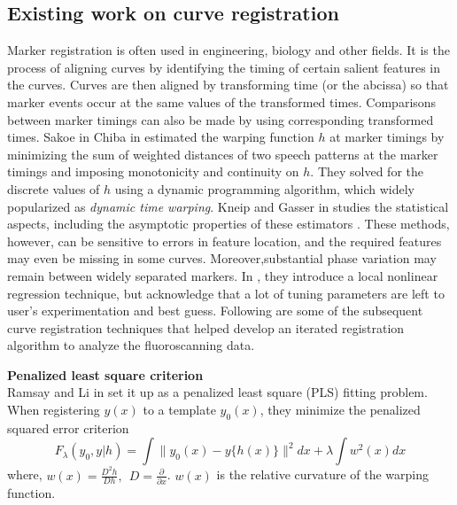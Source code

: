 \subsection{Existing work on curve registration} \label{ch3_registration}
Marker registration is often used in engineering, biology and other fields. It is the process of aligning curves by identifying the timing of certain salient features in the curves. Curves are then aligned by transforming time (or the abcissa) so that marker events occur at the same values of the transformed times. Comparisons between marker timings can also be made by using corresponding transformed times. Sakoe in Chiba in \cite{Sakoe_Chiba_1978_IEEE} estimated the warping function $h$ at marker timings by minimizing the sum of weighted distances of two speech patterns at the marker timings and imposing monotonicity and continuity on $h$. They solved for the discrete values of $h$ using a dynamic programming algorithm, which widely popularized as {\emph{dynamic time warping}}. Kneip and Gasser in \cite{Kneip_Gasser_1992_AnnStat} studies the statistical aspects, including the asymptotic properties of these estimators \cite{Kneip_etal_2000_CJS}. These methods, however, can be sensitive to errors in feature location, and the  required features may even be missing in some curves. Moreover,substantial phase variation may remain between widely separated markers. In \cite{Kneip_etal_2000_CJS}, they introduce a local nonlinear regression technique, but acknowledge that a lot of tuning parameters are left to user's experimentation and best guess. Following are some of the subsequent curve registration techniques that helped develop an iterated registration algorithm to analyze the fluoroscanning data. 

\noindent
{\bf{Penalized least square criterion}} \\
Ramsay and Li in \cite{Ramsay_Li_1998_JRSSB} set it up as a penalized least square (PLS) fitting problem. When registering $y(x)$ to a template $y_0(x)$, they minimize the penalized squared error criterion
\[ F_{\lambda}(y_0, y|h) = \displaystyle \int \| y_0(x) - y\{h(x)\} \|^2 dx + \lambda \displaystyle \int w^2(x)dx\]
where, $w(x) = \frac{D^2h}{Dh},\ \ D = \frac{\partial}{\partial x}$. $w(x)$ is the relative curvature of the warping function.

